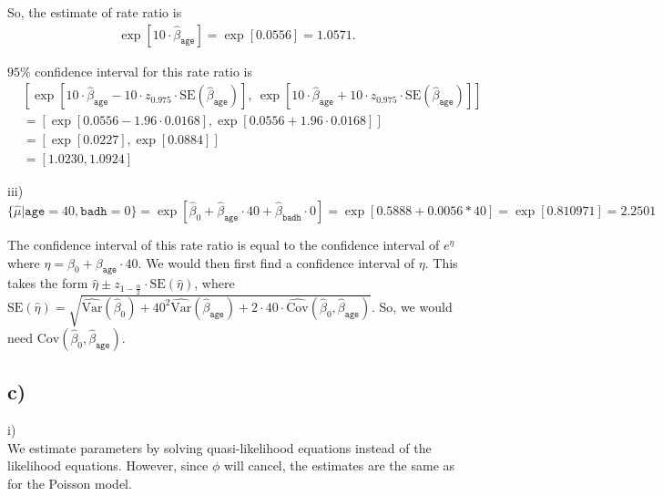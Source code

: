 \documentclass[a4paper]{article}
\newcommand{\Var}{\mathrm{Var}}
\newcommand{\Cov}{\mathrm{Cov}}
\begin{document}
So, the estimate of rate ratio is
\begin{align*}
\exp\left[10\cdot\widehat{\beta}_{\mathrm{\texttt{age}}}\right] = \exp\left[0.0556\right] = 1.0571.
\end{align*}

$95\%$ confidence interval for this rate ratio is
\begin{align*}
&\left[\exp\left[10\cdot\widehat{\beta}_{\mathrm{\texttt{age}}} - 10\cdot z_{0.975} \cdot \mathrm{SE}(\widehat{\beta}_{\mathrm{\texttt{age}}})\right],~\exp\left[10\cdot\widehat{\beta}_{\mathrm{\texttt{age}}} + 10\cdot z_{0.975} \cdot \mathrm{SE}(\widehat{\beta}_{\mathrm{\texttt{age}}})\right] \right]\\
&= [\exp[0.0556 - 1.96 \cdot 0.0168], \exp[0.0556 + 1.96 \cdot 0.0168]]\\
&= \left[\exp[0.0227], \exp[0.0884]\right]\\
&= [1.0230, 1.0924]
\end{align*}

iii)\\
$\{\widehat{\mu}|\texttt{age} = 40, \texttt{badh} = 0\} = \exp\left[\widehat{\beta}_{0} + \widehat{\beta}_{\texttt{age}}\cdot40 + \widehat{\beta}_{\texttt{badh}}\cdot0\right] = \exp\left[0.5888 + 0.0056*40\right] = \exp\left[0.810971\right] = 2.2501$

The confidence interval of this rate ratio is equal to the confidence interval of $e^{\eta}$ where $\eta = \beta_{0} + \beta_{\texttt{age}}\cdot40$. We would then first find a confidence interval of $\eta$. This takes the form $\widehat{\eta} \pm z_{1-\frac{\alpha}{2}}\cdot \mathrm{SE}(\widehat{\eta})$, where $\mathrm{SE}(\widehat{\eta}) = \sqrt{\widehat{\Var}(\widehat{\beta}_{0}) + 40^{2}\widehat{\Var}(\widehat{\beta}_{\texttt{age}}) + 2\cdot40\cdot \widehat{\Cov}\left(\widehat{\beta}_{0}, \widehat{\beta}_{\texttt{age}}\right)}$. So, we would need $\Cov\left(\widehat{\beta}_{0}, \widehat{\beta}_{\texttt{age}}\right)$.


\vspace{\baselineskip}
\subsection{c)}

i)\\
We estimate parameters by solving quasi-likelihood equations instead of the likelihood equations. However, since $\phi$ will cancel, the estimates are the same as for the Poisson model.
\end{document}
